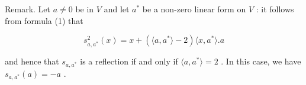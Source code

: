 Remark. Let \(a \neq 0\) be in \(V\) and let \(a^*\) be a non-zero linear form on \(V\) : it follows from formula (1) that

\[
s _ {a, a ^ {*}} ^ {2} (x) = x + \left(\langle a, a ^ {*} \rangle - 2\right) \langle x, a ^ {*} \rangle . a
\]

and hence that \(s_{a,a^*}\) is a reflection if and only if \(\langle a, a^* \rangle = 2\) . In this case, we have \(s_{a,a^*}(a) = -a\) .

